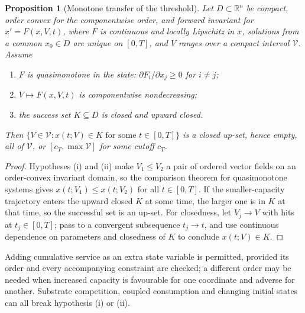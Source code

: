 \documentclass[11pt]{article}
\newtheorem{proposition}[theorem]{Proposition}
\theoremstyle{definition}
\newcommand{\R}{\mathbb R}
\begin{document}
\begin{proposition}[Monotone transfer of the threshold]\label{prop:monotone}
Let $D\subset\R^n$ be compact, order convex for the componentwise order, and
forward invariant for $x'=F(x,V,t)$, where $F$ is continuous and locally
Lipschitz in $x$, solutions from a common $x_0\in D$ are unique on $[0,T]$, and
$V$ ranges over a compact interval $\mathcal V$. Assume
\begin{enumerate}
\item $F$ is quasimonotone in the state: $\partial F_i/\partial x_j\ge0$ for
$i\ne j$;
\item $V\mapsto F(x,V,t)$ is componentwise nondecreasing;
\item the success set $K\subseteq D$ is closed and upward closed.
\end{enumerate}
Then $\{V\in\mathcal V:x(t;V)\in K\text{ for some }t\in[0,T]\}$ is a closed
up-set, hence empty, all of $\mathcal V$, or $[c_T,\max\mathcal V]$ for some
cutoff $c_T$.
\end{proposition}
\begin{proof}
Hypotheses (i) and (ii) make $V_1\le V_2$ a pair of ordered vector fields on an
order-convex invariant domain, so the comparison theorem for quasimonotone
systems \cite{walter,smith,angeli} gives $x(t;V_1)\le x(t;V_2)$ for all
$t\in[0,T]$. If the smaller-capacity trajectory enters the upward closed $K$ at
some time, the larger one is in $K$ at that time, so the successful set is an
up-set. For closedness, let $V_j\to V$ with hits at $t_j\in[0,T]$; pass to a
convergent subsequence $t_j\to t$, and use continuous dependence on parameters
and closedness of $K$ to conclude $x(t;V)\in K$.
\end{proof}

Adding cumulative service as an extra state variable is permitted, provided its
order and every accompanying constraint are checked; a different order may be
needed when increased capacity is favourable for one coordinate and adverse
for another. Substrate competition, coupled consumption and changing initial
states can all break hypothesis (i) or (ii).
\end{document}
